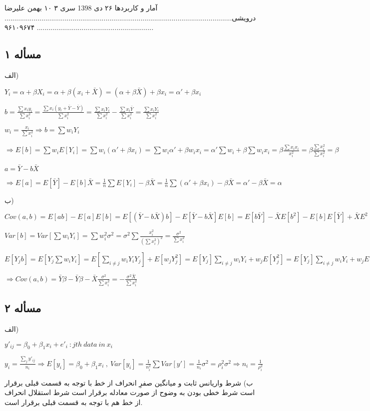 \documentclass[12pt]{article}
\begin{document}
\handout
{آمار و کاربردها}
{}
{۲۶ دی 1398}
{سری ۳}
{۱۰ بهمن}
علیرضا درویشی................................................................................................................................................................................. ۹۶۱۰۹۶۷۴
\subsection*{مسأله ۱}
الف)
\begin{flushleft}
$Y_i=\alpha+\beta X_i=\alpha+\beta(x_i+\bar{X})=(\alpha+\beta \bar{X})+\beta x_i=\alpha'+\beta x_i$

$b=\frac{\sum{x_iy_i}}{\sum{x_i^2}}=\frac{\sum{x_i(y_i+\bar{Y}-\bar{Y})}}{\sum{x_i^2}}=\frac{\sum{x_iY_i}}{\sum{x_i^2}}-\frac{\sum{x_i\bar{Y}}}{\sum{x_i^2}}=\frac{\sum{x_iY_i}}{\sum{x_i^2}}$

$w_i=\frac{x_i}{\sum{x_i^2}}\Rightarrow b=\sum{w_iY_i}$

$ \Rightarrow E[b]=\sum{w_iE[Y_i]}=\sum{w_i(\alpha'+\beta x_i)}=\sum{w_i\alpha'+\beta w_i x_i}=\alpha'\sum{w_i}+\beta \sum{w_ix_i}=\beta \frac{\sum{x_ix_i}}{x_i^2}=\beta\frac{\sum{x_i^2}}{\sum{x_i^2}}=\beta$

$a=\bar{Y}-b\bar{X}$

$\Rightarrow E[a]=E[\bar{Y}]-E[b]\bar{X}=\frac{1}{n}\sum{E[Y_i]}-\beta \bar{X}=\frac{1}{n}\sum({\alpha'+\beta x_i})-\beta \bar{X}=\alpha'-\beta \bar{X}=\alpha$
\end{flushleft}
ب)
\begin{flushleft}
$Cov(a,b)=E[ab]-E[a]E[b]=E[(\bar{Y}-b \bar{X})b]-E[\bar{Y}-b \bar{X}]E[b]=E[b\bar{Y}]-\bar{X}E[b^2]-E[b]E[\bar{Y}]+\bar{X}E^2[b]=E[b\bar{Y}]-E[b]E[\bar{Y}]-\bar{X}Var[b]$

$Var[b]=Var[\sum{w_iY_i}]=\sum{w_i^2\sigma^2}=\sigma^2\sum{\frac{x_i^2}{(\sum{x_i^2})^2}}=\frac{\sigma^2}{\sum{x_i^2}}$

$E[Y_jb]=E[Y_j\sum{w_iY_i}]=E[\sum_{i\neq j}{w_iY_iY_j}]+E[w_jY_j^2]=E[Y_j]\sum_{i \neq j}{w_iY_i}+{w_jE[Y_j^2]}=E[Y_j]\sum_{i \neq j}{w_iY_i}+{w_jE[Y_j^2]}-{w_jE^2[Y_j]}+{w_jE^2[Y_j]}=E[Y_j]\sum{w_iE[Y_i]}+w_j\sigma^2=\beta E[Y_j]+w_j\sigma^2\Rightarrow E[\bar{Y}b]=\frac{1}{n}\sum{E[Y_jb]}=\bar{Y}\beta$

$\Rightarrow Cov(a,b)=\bar{Y}\beta-\bar{Y}\beta-\bar{X}\frac{\sigma^2}{\sum x_i^2}=-\frac{\sigma^2\bar{X}}{\sum x_i^2}$
\end{flushleft}
\subsection*{مسأله‌ ۲}
الف)
\begin{flushleft}
$y'_{ij}=\beta_0+\beta_1x_i+e'_i \ : jth\ data\ in\ x_i$

$y_i=\frac{\sum_j{y'_{ij}}}{n_i}\Rightarrow E[y_i]=\beta_0+\beta_1x_i\ ,\ Var[y_i]=\frac{1}{n_i^2}\sum{Var[y']}=\frac{1}{n_i}\sigma^2=\rho_i^2\sigma^2\Rightarrow n_i=\frac{1}{\rho_i^2}$
\end{flushleft}
ب)
شرط واریانس ثابت و میانگین صفرِ انحراف از خط با توجه به قسمت قبلی برقرار است
شرط خطی بودن به وضوح از صورت معادله برقرار است
شرط استقلال انحراف از خط هم با توجه به قسمت قبلی برقرار است.
\end{document}
